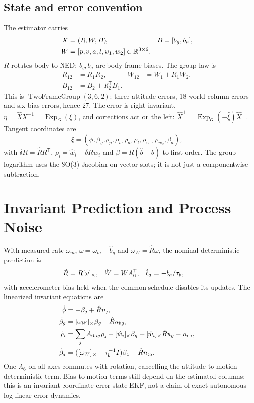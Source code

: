 \documentclass[conference]{IEEEtran}
\newcommand{\T}{^{\mathsf T}}\newcommand{\Hh}{^{\mathsf H}}
\DeclareMathOperator{\Exp}{Exp}\DeclareMathOperator{\Log}{Log}
\begin{document}
\subsection{State and error convention}
The estimator carries
\begin{align}
 X&=(R,W,B),& B&=[b_g,b_a],\\
 W&=[p,v,a,l,w_1,w_2]\in\mathbb R^{3\times6}.
\end{align}
$R$ rotates body to NED; $b_g,b_a$ are body-frame biases. The group law is
\begin{align}
 R_{12}&=R_1R_2,& W_{12}&=W_1+R_1W_2,\\
 B_{12}&=B_2+R_2\T B_1.
\end{align}
This is $\operatorname{TwoFrameGroup}(3,6,2)$: three attitude errors,
18 world-column errors and six bias errors, hence 27. The error is right
invariant, $\eta=\hat X X^{-1}=\Exp_G(\xi)$, and corrections act on the left:
$\hat X^+=\Exp_G(-\hat\xi)\hat X^-$. Tangent coordinates are
\begin{equation}
 \xi=(\phi,\beta_g,\rho_p,\rho_v,\rho_a,\rho_l,\rho_{w_1},\rho_{w_2},\beta_a),
\end{equation}
with $\delta R=\hat R R\T$, $\rho_i=\hat w_i-\delta Rw_i$ and
$\beta=R(\hat b-b)$ to first order. The group logarithm uses the SO(3)
Jacobian on vector slots; it is not just a componentwise subtraction.

\section{Invariant Prediction and Process Noise}
With measured rate $\omega_m$, $\omega=\omega_m-\hat b_g$ and
$\omega_W=\hat R\omega$, the nominal deterministic prediction is
\begin{align}
 \dot R&=R\sk{\omega}, &\dot W&=WA_6\T, &
 \dot b_a&=-b_a/\tau_b,
\end{align}
with accelerometer bias held when the common schedule disables its updates.
The linearized invariant equations are
\begin{align}
 \dot\phi&=-\beta_g+\hat Rn_g,\\
 \dot\beta_g&=[\omega_W]_\times\beta_g-\hat Rn_{bg},\\
 \dot\rho_i&=\sum_j A_{6,ij}\rho_j-[\hat w_i]_\times\beta_g
             +[\hat w_i]_\times\hat Rn_g-n_{c,i},\\
 \dot\beta_a&=([\omega_W]_\times-\tau_b^{-1}I)\beta_a-\hat Rn_{ba}.
 \label{eq:continuous}
\end{align}
One $A_6$ on all axes commutes with rotation, cancelling the
attitude-to-motion deterministic term. Bias-to-motion terms still depend on
the estimated columns: this is an invariant-coordinate error-state EKF,
not a claim of exact autonomous log-linear error dynamics.
\end{document}
